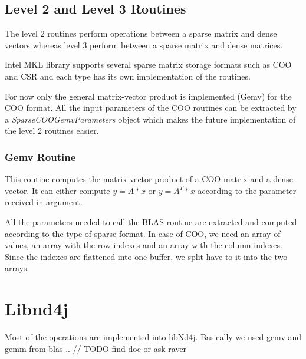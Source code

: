 \subsection{Level 2 and Level 3 Routines}

The level 2 routines perform operations between a sparse matrix and dense vectors whereas level 3 perform between a sparse matrix and dense matrices.

Intel MKL library supports several  sparse matrix storage formats such as COO and CSR and each type has its own implementation of the routines.

For now only the general matrix-vector product is implemented (Gemv) for the COO format. All the input parameters of the COO routines can be extracted by a \textit{SparseCOOGemvParameters} object which makes the future implementation of the level 2 routines easier.

\subsubsection{Gemv Routine}
This routine computes the matrix-vector product of a COO matrix and a dense vector. It can either compute $y = A*x$ or $y = A^{T}*x$ according to the parameter received in argument.

All the parameters needed to call the BLAS routine are extracted and computed according to the type of sparse format.
In case of COO, we need an array of values, an array with the row indexes and an array with the column indexes. Since the indexes are flattened into one buffer, we split have to it into the two arrays.

\section{Libnd4j}
Most of the operations are implemented into libNd4j. Basically we used gemv and gemm from blas
..
// TODO find doc or ask raver